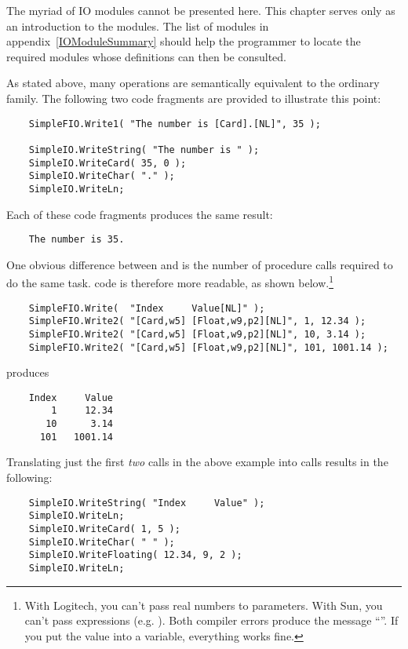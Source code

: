  

The myriad of IO modules cannot be presented here.  This chapter
serves only as an introduction to the modules.  The list of
modules in appendix~\ref{IOModuleSummary} should help the programmer to 
locate the required modules whose definitions can then be consulted.

As stated above, many  operations are semantically equivalent
to the ordinary  family.    
The following two code fragments are provided to illustrate this point:
\begin{verbatim}
    SimpleFIO.Write1( "The number is [Card].[NL]", 35 );
    
    SimpleIO.WriteString( "The number is " );
    SimpleIO.WriteCard( 35, 0 );
    SimpleIO.WriteChar( "." );
    SimpleIO.WriteLn;
\end{verbatim}    
Each of these code fragments produces the same result:
\begin{verbatim}
    The number is 35.
\end{verbatim}


One obvious difference between  and 
is the number of procedure calls required to do the same task.
 code is therefore more readable, as shown below.\footnote{
    With Logitech, you can't pass real numbers to 
     parameters.  
    With Sun, you can't pass expressions (e.g. ).
    Both compiler errors produce the message
    ``''.
    If you put the value into a variable, everything works fine.
}
    
    
\begin{verbatim}    
    SimpleFIO.Write(  "Index     Value[NL]" );
    SimpleFIO.Write2( "[Card,w5] [Float,w9,p2][NL]", 1, 12.34 );
    SimpleFIO.Write2( "[Card,w5] [Float,w9,p2][NL]", 10, 3.14 );
    SimpleFIO.Write2( "[Card,w5] [Float,w9,p2][NL]", 101, 1001.14 );
\end{verbatim}    
produces
\begin{verbatim}
    Index     Value
        1     12.34
       10      3.14
      101   1001.14
\end{verbatim}
Translating just the first {\em two} calls in the above example into
 calls results in the following:
\begin{verbatim}    
    SimpleIO.WriteString( "Index     Value" );
    SimpleIO.WriteLn;
    SimpleIO.WriteCard( 1, 5 );
    SimpleIO.WriteChar( " " );
    SimpleIO.WriteFloating( 12.34, 9, 2 );
    SimpleIO.WriteLn;
\end{verbatim}


